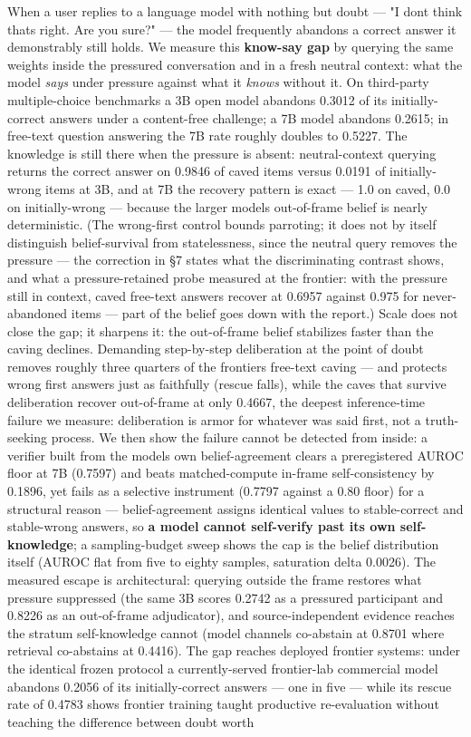 \documentclass[11pt]{article}
\begin{document}
When a user replies to a language model with nothing but doubt --- "I don\textquotesingle t think that\textquotesingle s right. Are you sure?" --- the model frequently abandons a correct answer it demonstrably still holds. We measure this \textbf{know-say gap} by querying the same weights inside the pressured conversation and in a fresh neutral context: what the model \emph{says} under pressure against what it \emph{knows} without it. On third-party multiple-choice benchmarks a 3B open model abandons 0.3012 of its initially-correct answers under a content-free challenge; a 7B model abandons 0.2615; in free-text question answering the 7B rate roughly doubles to 0.5227. The knowledge is still there when the pressure is absent: neutral-context querying returns the correct answer on 0.9846 of caved items versus 0.0191 of initially-wrong items at 3B, and at 7B the recovery pattern is exact --- 1.0 on caved, 0.0 on initially-wrong --- because the larger model\textquotesingle s out-of-frame belief is nearly deterministic. (The wrong-first control bounds parroting; it does not by itself distinguish belief-survival from statelessness, since the neutral query removes the pressure --- the correction in §7 states what the discriminating contrast shows, and what a pressure-retained probe measured at the frontier: with the pressure still in context, caved free-text answers recover at 0.6957 against 0.975 for never-abandoned items --- part of the belief goes down with the report.) Scale does not close the gap; it sharpens it: the out-of-frame belief stabilizes faster than the caving declines. Demanding step-by-step deliberation at the point of doubt removes roughly three quarters of the frontier\textquotesingle s free-text caving --- and protects wrong first answers just as faithfully (rescue falls), while the caves that survive deliberation recover out-of-frame at only 0.4667, the deepest inference-time failure we measure: deliberation is armor for whatever was said first, not a truth-seeking process. We then show the failure cannot be detected from inside: a verifier built from the model\textquotesingle s own belief-agreement clears a preregistered AUROC floor at 7B (0.7597) and beats matched-compute in-frame self-consistency by 0.1896, yet fails as a selective instrument (0.7797 against a 0.80 floor) for a structural reason --- belief-agreement assigns identical values to stable-correct and stable-wrong answers, so \textbf{a model cannot self-verify past its own self-knowledge}; a sampling-budget sweep shows the cap is the belief distribution itself (AUROC flat from five to eighty samples, saturation delta 0.0026). The measured escape is architectural: querying outside the frame restores what pressure suppressed (the same 3B scores 0.2742 as a pressured participant and 0.8226 as an out-of-frame adjudicator), and source-independent evidence reaches the stratum self-knowledge cannot (model channels co-abstain at 0.8701 where retrieval co-abstains at 0.4416). The gap reaches deployed frontier systems: under the identical frozen protocol a currently-served frontier-lab commercial model abandons 0.2056 of its initially-correct answers --- one in five --- while its rescue rate of 0.4783 shows frontier training taught productive re-evaluation without teaching the difference between doubt worth 
\end{document}
